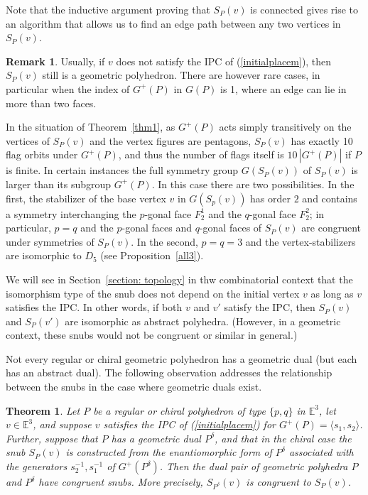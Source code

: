 \documentclass[12pt]{article}
\newtheorem{theorem}{Theorem}[section]
\theoremstyle{definition}\newtheorem{definition}{Definition}[section]
\newtheorem{remark}{Remark}[]
\begin{document}
Note that the inductive argument proving that ${S}_P(v)$ is connected gives rise to an algorithm that allows us to find an edge path between any two vertices in ${S}_P(v)$. 
\smallskip

\begin{remark}
\label{vinclD}
Usually, if $v$ does not satisfy the IPC of (\ref{initialplacem}), then ${S}_P(v)$ still is a geometric polyhedron. There are however rare cases, in particular when the index of $G^+(P)$ in $G(P)$ is 1, where an edge can lie in more than two faces. 
\end{remark}\smallskip

In the situation of Theorem~\ref{thm1}, as $G^{+}(P)$ acts simply transitively on the vertices of $S_P(v)$ and the vertex figures are pentagons, $S_P(v)$ has exactly 10 flag orbits under $G^+(P)$, and thus the number of flags itself is $10\,|G^{+}(P)|$ if $P$ is finite.  In certain instances the full symmetry group $G(S_P(v))$ of $S_P(v)$ is larger than its subgroup $G^+(P)$. In this case there are two possibilities. In the first, the stabilizer of the base vertex $v$ in $G(S_p(v))$ has order $2$ and contains a symmetry interchanging the $p$-gonal face $F_2^1$ and the $q$-gonal face $F_2^2$; in particular, $p=q$ and the $p$-gonal faces and $q$-gonal faces of $S_P(v)$ are congruent under symmetries of $S_P(v)$. In the second, $p=q=3$ and the vertex-stabilizers are isomorphic to $D_5$ (see Proposition~\ref{all3}).
\smallskip

We will see in Section~\ref{section: topology} in thw combinatorial context that the isomorphism type of the snub does not depend on the initial vertex $v$ as long as $v$ satisfies the IPC. In other words, if both $v$ and $v'$ satisfy the IPC, then $S_P(v)$ and $S_P(v')$ are isomorphic as abstract polyhedra. (However, in a geometric context, these snubs would not be congruent or similar in general.)

Not every regular or chiral geometric polyhedron has a geometric dual (but each has an abstract dual). The following observation addresses the relationship between the snubs in the case where geometric duals exist.
\smallskip

\begin{theorem}
Let $P$ be a regular or chiral polyhedron of type $\{p,q\}$ in $\mathbb{E}^3$, let $v\in \mathbb{E}^3$, and suppose $v$ satisfies the IPC of (\ref{initialplacem}) for $G^+(P)=\langle s_1,s_2\rangle$. Further, suppose that $P$ has a geometric dual $P^{\delta}$, and that in the chiral case the snub $S_P(v)$ is constructed from the enantiomorphic form of $P^{\delta}$ associated with the generators $s_2^{-1},s_1^{-1}$ of $G^{+}(P^\delta)$. Then the dual pair of geometric polyhedra $P$ and $P^{\delta}$ have congruent snubs. More precisely, ${S}_{P^{\delta}}(v)$ is congruent to ${S}_P(v)$. 
\end{theorem}
\end{document}
